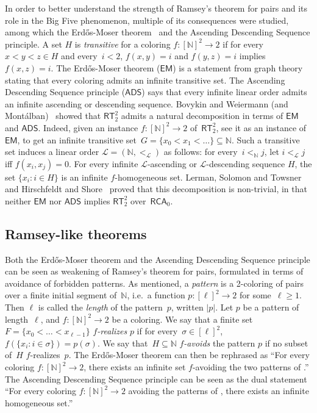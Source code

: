 \documentclass{article}
\def\L{\mathcal{L}}
\newcommand{\RCA}[0]{\mathsf{RCA}}
\newcommand{\ADS}[0]{\mathsf{ADS}}
\newcommand{\EM}[0]{\mathsf{EM}}
\newcommand{\RT}[0]{\mathsf{RT}}
\newcommand{\NN}[0]{\mathbb{N}}
\def\qt#1{``#1''}%
\def\NN{\mathbb{N}}
\renewcommand{\L}[0]{\mathcal{L}}
\def\qt#1{``#1''}%
\numberwithin{theorem}{section}
\theoremstyle{definition}
\begin{document}
In order to better understand the strength of Ramsey's theorem for pairs and its role in the Big Five phenomenon, multiple of its consequences were studied, among which the Erd\H{o}s-Moser theorem~\cite{erdos1964representation} and the Ascending Descending Sequen\-ce principle. A set $H$ is \emph{transitive} for a coloring $f : [\NN]^2 \to 2$ if for every $x < y < z \in H$ and every~$i < 2$, $f(x, y) = i$ and $f(y, z) = i$ implies $f(x, z) = i$. The Erd\H{o}s-Moser theorem ($\EM$) is a statement from graph theory stating that every coloring admits an infinite transitive set. The Ascending Descending Sequence principle ($\ADS$) says that every infinite linear order admits an infinite ascending or descending sequence. Bovykin and Weiermann (and Mont\'alban)~\cite{bovykin2017strength} showed that $\RT^2_2$ admits a natural decomposition in terms of $\EM$ and $\ADS$. Indeed, given an instance $f : [\NN]^2 \to 2$ of~$\RT^2_2$, see it as an instance of~$\EM$, to get an infinite transitive set~$G = \{ x_0 < x_1 < \dots \} \subseteq \NN$. Such a transitive set induces a linear order $\L = (\NN, <_\L)$ as follows: for every~$i <_\NN j$, let $i <_\L j$ iff $f(x_i, x_j) = 0$. For every infinite $\L$-ascending or $\L$-descending sequence $H$, the set $\{ x_i : i \in H \}$ is an infinite $f$-homogeneous set. Lerman, Solomon and Towsner~\cite{lerman2013separating} and Hirschfeldt and Shore~\cite{hirschfeldt2008strength} proved that this decomposition is non-trivial, in that neither $\EM$ nor $\ADS$ implies $\RT^2_2$ over~$\RCA_0$.

\subsection{Ramsey-like theorems}

Both the Erd\H{o}s-Moser theorem and the Ascending Descending Sequence principle can be seen as weakening of Ramsey's theorem for pairs, formulated in terms of avoidance of forbidden patterns. As mentioned, a \emph{pattern} is a 2-coloring of pairs over a finite initial segment of~$\NN$, i.e.\ a function $p : [\ell]^2 \to 2$ for some~$\ell \geq 1$. Then $\ell$ is called the \emph{length} of the pattern~$p$, written $|p|$. 
Let $p$ be a pattern of length~$\ell$, and $f : [\NN]^2 \to 2$ be a coloring. We say that a finite set $F = \{ x_0 < \dots < x_{\ell-1} \}$ \emph{$f$-realizes} $p$ if for every~$\sigma \in [\ell]^2$, $f(\{x_i : i \in \sigma\}) = p(\sigma)$. We say that~$H \subseteq \NN$ \emph{$f$-avoids} the pattern $p$ if no subset of~$H$ $f$-realizes~$p$.
The Erd\H{o}s-Moser theorem can then be rephrased as \qt{For every coloring $f : [\NN]^2 \to 2$, there exists an infinite set $f$-avoiding the two patterns of \Cref{fig:non-transitivity}.} The Ascending Descending Sequence principle can be seen as the dual statement \qt{For every coloring $f : [\NN]^2 \to 2$ avoiding the patterns of \Cref{fig:non-transitivity}, there exists an infinite homogeneous set.}
\end{document}
